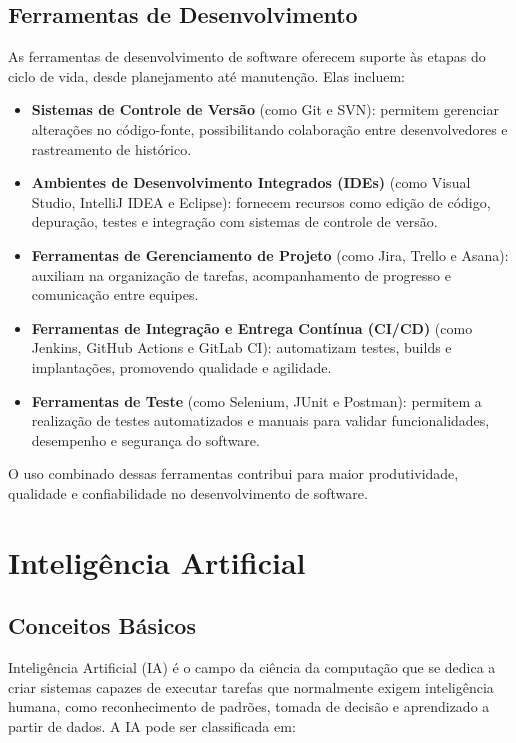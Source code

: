 \subsection{Ferramentas de Desenvolvimento}

As ferramentas de desenvolvimento de software oferecem suporte às etapas do ciclo de vida, desde planejamento até manutenção. Elas incluem:

\begin{itemize}
    \item \textbf{Sistemas de Controle de Versão} (como Git e SVN): permitem gerenciar alterações no código-fonte, possibilitando colaboração entre desenvolvedores e rastreamento de histórico.
    \item \textbf{Ambientes de Desenvolvimento Integrados (IDEs)} (como Visual Studio, IntelliJ IDEA e Eclipse): fornecem recursos como edição de código, depuração, testes e integração com sistemas de controle de versão.
    \item \textbf{Ferramentas de Gerenciamento de Projeto} (como Jira, Trello e Asana): auxiliam na organização de tarefas, acompanhamento de progresso e comunicação entre equipes.
    \item \textbf{Ferramentas de Integração e Entrega Contínua (CI/CD)} (como Jenkins, GitHub Actions e GitLab CI): automatizam testes, builds e implantações, promovendo qualidade e agilidade.
    \item \textbf{Ferramentas de Teste} (como Selenium, JUnit e Postman): permitem a realização de testes automatizados e manuais para validar funcionalidades, desempenho e segurança do software.
\end{itemize}

O uso combinado dessas ferramentas contribui para maior produtividade, qualidade e confiabilidade no desenvolvimento de software.

\section{Inteligência Artificial}
\subsection{Conceitos Básicos}

Inteligência Artificial (IA) é o campo da ciência da computação que se dedica a criar sistemas capazes de executar tarefas que normalmente exigem inteligência humana, como reconhecimento de padrões, tomada de decisão e aprendizado a partir de dados. A IA pode ser classificada em:

